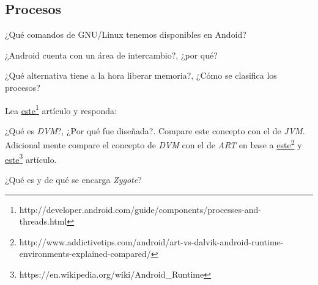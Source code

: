 \subsection{Procesos}
\begin{questions}
  \question ¿Qué comandos de GNU/Linux tenemos disponibles en Andoid?
  
  \question ¿Android cuenta con un área de intercambio?, ¿por qué?
  
  \question ¿Qué alternativa tiene a la hora liberar memoria?, ¿Cómo se clasifica los procesos?
  
  \question Lea \href{http://developer.android.com/guide/components/processes-and-threads.html}{este}\footnote{http://developer.android.com/guide/components/processes-and-threads.html} artículo y responda:

  \question ¿Qué es \textit{DVM}?, ¿Por qué fue diseñada?. Compare este concepto con el de \textit{JVM}. Adicional mente compare el concepto de \textit{DVM} con el de \textit{ART} en base a \href{http://www.addictivetips.com/android/art-vs-dalvik-android-runtime-environments-explained-compared/}{este}\footnote{http://www.addictivetips.com/android/art-vs-dalvik-android-runtime-environments-explained-compared/} y \href{https://en.wikipedia.org/wiki/Android\_Runtime}{este}\footnote{https://en.wikipedia.org/wiki/Android\_Runtime} artículo.

  \question ¿Qué es y de qué se encarga \textit{Zygote}?
\end{questions}

